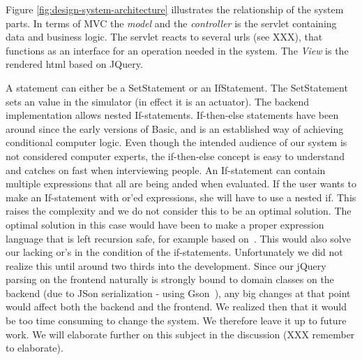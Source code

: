 Figure \ref{fig:design-system-architecture} illustrates the relationship of the system parts. In terms of MVC the \textit{model} and the \textit{controller} is the servlet containing data and business logic. The servlet reacts to several urls (see XXX), that functions as an interface for an operation needed in the system. The \textit{View} is the rendered html based on JQuery.

\begin{figure}[t]
\end{figure}

A statement can either be a SetStatement or an IfStatement. The SetStatement sets an value in the simulator (in effect it is an actuator). The backend implementation allows nested If-statements. If-then-else statements have been around since the early versions of Basic, and is an established way of achieving conditional computer logic. Even though the intended audience of our system is not considered computer experts, the if-then-else concept is easy to understand and catches on fast when interviewing people. An If-statement can contain multiple expressions that all are being anded when evaluated. If the user wants to make an If-statement with or'ed expressions, she will have to use a nested if. This raises the complexity and we do not consider this to be an optimal solution. The optimal solution in this case would have been to make a proper expression language that is left recursion safe, for example based on~\cite{left-recursion}. This would also solve our lacking or's in the condition of the if-statements. Unfortunately we did not realize this until around two thirds into the development. Since our jQuery~\cite{jquery} parsing on the frontend naturally is strongly bound to domain classes on the backend (due to JSon serialization - using Gson~\cite{gson}), any big changes at that point would affect both the backend and the frontend. We realized then that it would be too time consuming to change the system. We therefore leave it up to future work. We will elaborate further on this subject in the discussion (XXX remember to elaborate). 

